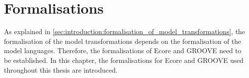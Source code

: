\chapter{Formalisations}
\label{chapter:formalisations}

As explained in \cref{sec:introduction:formalisation_of_model_transformations}, the formalisation of the model transformations depends on the formalisation of the model languages. Therefore, the formalisations of Ecore and GROOVE need to be established. In this chapter, the formalisations for Ecore and GROOVE used throughout this thesis are introduced. 



